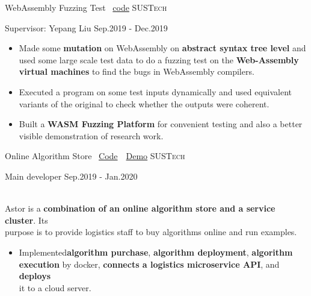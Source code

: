 \documentclass[10pt,a4paper]{article}
\begin{document}
\spacedhrule{1.6em}{-0.4em}



\headedsection
  {WebAssembly Fuzzing Test \faGithub~\href{https://github.com/Eveneko/WASM-Fuzzing-Platform}{code}}
  {\textsc{SUSTech}} {%
  \headedsubsection
    {Supervisor: Yepang Liu}
    {Sep.2019 - Dec.2019}
    {
      \begin{itemize} 
        \item Made some \textbf{mutation} on WebAssembly on \textbf{abstract syntax tree level} and \\
        used some large scale test data to do a fuzzing test on the \textbf{Web-Assembly \\
        virtual machines} to find the bugs in WebAssembly compilers.
        \item Executed a program on some test inputs dynamically and used equivalent \\
        variants of the original to check whether the outputs were coherent.
        \item Built a \textbf{WASM Fuzzing Platform} for convenient testing and also a better \\
        visible demonstration of research work.
      \end{itemize}
    }
}


\spacedhrule{0.5em}{-0.4em}


\headedsection
  {Online Algorithm Store \faGithub~\href{https://github.com/Eveneko/Astor}{Code}~\faLink~\href{https://astor.eveneko.com}{Demo}} 
  {\textsc{SUSTech}} {%
  \headedsubsection
    {Main developer}
    {Sep.2019 - Jan.2020}
    {
      \\
      Astor is a \textbf{combination of an online algorithm store and a service cluster}. Its \\
      purpose is to provide logistics staff to buy algorithms online and run examples.
      \begin{itemize}
        \item Implemented\textbf{algorithm purchase}, \textbf{algorithm deployment}, \textbf{algorithm \\
        execution} by docker, \textbf{connects a logistics microservice API}, and \textbf{deploys} \\
        it to a cloud server.
      \end{itemize}
    }
}
\end{document}
